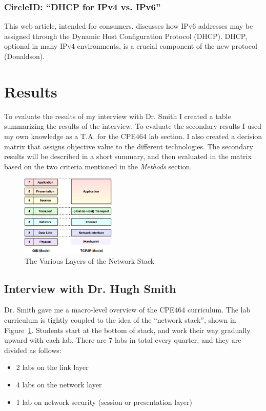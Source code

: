 \documentclass[12pt]{article}
\begin{document}
\subsubsection{CircleID: ``DHCP for IPv4 vs. IPv6''}
This web article, intended for consumers, discusses how IPv6 addresses may be assigned through the Dynamic Host Configuration Protocol (DHCP). DHCP, optional in many IPv4 environments, is a crucial component of the new protocol (Donaldson).

\section{Results}
To evaluate the results of my interview with Dr. Smith I created a table summarizing the results of the interview. To evaluate the secondary results I used my own knowledge as a T.A. for the CPE464 lab section. I also created a decision matrix that assigns objective value to the different technologies. The secondary results will be described in a short summary, and then evaluated in the matrix based on the two criteria mentioned in the \textit{Methods} section.

\begin{figure}[ht!]
  \centering
  \includegraphics[width=0.4\textwidth]{the_stack.png}
  \caption{The Various Layers of the Network Stack}
  \label{fig:the_stack}
\end{figure}

\subsection{Interview with Dr. Hugh Smith}
Dr. Smith gave me a macro-level overview of the CPE464 curriculum. The lab curriculum is tightly coupled to the idea of the ``network stack'', shown in Figure~\ref{fig:the_stack}. Students start at the bottom of stack, and work their way gradually upward with each lab. There are 7 labs in total every quarter, and they are divided as follows:
\begin{itemize}
\item 2 labs on the link layer
\item 4 labs on the network layer
\item 1 lab on network security (session or presentation layer)
\end{itemize}
\end{document}
